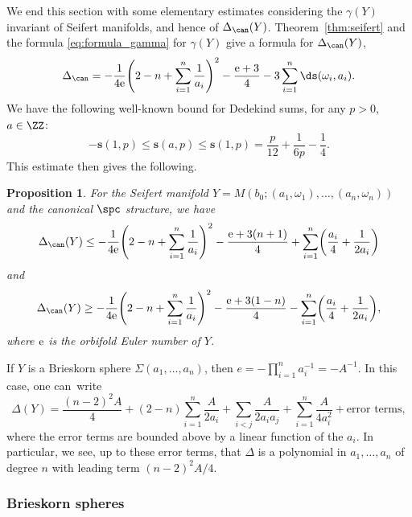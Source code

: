 \documentclass[pdftex]{sigma}
\newtheorem{Proposition}[Theorem]{Proposition}
 { \theoremstyle{definition}
\newtheorem{Definition}[Theorem]{Definition}
\newtheorem{Note}[Theorem]{Note}
\newtheorem{Example}[Theorem]{Example}
\newtheorem{Remark}[Theorem]{Remark}
\newtheorem{Question}[theorem]{Question}
}
\begin{document}
We end this section with some elementary estimates considering the $\gamma(Y)$ invariant of Seifert manifolds, and hence of $\Delta_{\can}(Y)$. Theorem~\ref{thm:seifert} and the formula \eqref{eq:formula_gamma} for $\gamma(Y)$ give a formula for $\Delta_{\can}(Y)$,
 \begin{equation}\label{eq:formula_delta}
 \Delta_{\can} = - \frac{1}{4{\rm e}}\Biggl(2-n + \sum_{i=1}^n \frac{1}{a_i}\Biggr)^2 - \frac{{\rm e}+3}{4} - 3 \sum_{i=1}^n \ds(\omega_i, a_i).
 \end{equation}
We have the following well-known bound for Dedekind sums, for any $p>0$, $a \in \ZZ$:
\begin{equation*}%
 -\mathbf{s}(1, p) \leq \mathbf{s}(a, p) \leq \mathbf{s}(1, p) = \frac{p}{12} + \frac{1}{6p} - \frac{1}{4}.
\end{equation*}
This estimate then gives the following.

\begin{Proposition}\label{lower-bound-delta-general-seifert}
 For the Seifert manifold $Y = M(b_0;(a_1, \omega_1), \dots, (a_n, \omega_n))$ and the canonical $\spc$ structure, we have
 \[
 \Delta_{\can}(Y) \leq - \frac{1}{4{\rm e}}\Biggl(2-n + \sum_{i=1}^n \frac{1}{a_i}\Biggr)^2 - \frac{{\rm e}+3(n+1)}{4} + \sum_{i=1}^n \biggl( \frac{a_i}{4} + \frac{1}{2a_i}\biggr)
 \]
 and
 \[
 \Delta_{\can}(Y) \geq -\frac{1}{4{\rm e}}\Biggl(2-n + \sum_{i=1}^n \frac{1}{a_i}\Biggr)^2 -\frac{{\rm e}+3(1-n)}{4} - \sum_{i=1}^n \biggl(\frac{a_i}{4} + \frac{1}{2a_i}\biggr),
 \]
 where ${\rm e}$ is the orbifold Euler number of $Y$.
\end{Proposition}

If $Y$ is a Brieskorn sphere $\Sigma(a_1, \dots, a_n)$, then $e = -\prod_{i=1}^n a_i^{-1}=-A^{-1}$. In this case, one can~write
\begin{equation*}
 \Delta(Y) = \frac{(n-2)^2A}{4} + (2-n) \sum_{i=1}^n \frac{A}{2a_i} + \sum_{i < j}\frac{A}{2a_ia_j} + \sum_{i=1}^n \frac{A}{4a_i^2} + \text{error terms},
\end{equation*}
where the error terms are bounded above by a linear function of the $a_i$. In particular, we see, up to these error terms, that $\Delta$ is a polynomial in $a_1, \dots, a_n$ of degree $n$ with leading term $(n-2)^2A/4$.

\subsubsection{Brieskorn spheres}
\end{document}

